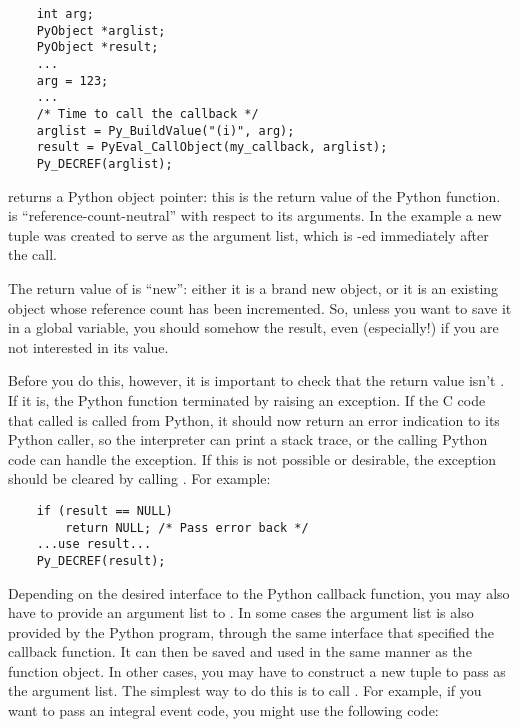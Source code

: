 \documentclass{manual}
\begin{document}
\begin{verbatim}
    int arg;
    PyObject *arglist;
    PyObject *result;
    ...
    arg = 123;
    ...
    /* Time to call the callback */
    arglist = Py_BuildValue("(i)", arg);
    result = PyEval_CallObject(my_callback, arglist);
    Py_DECREF(arglist);
\end{verbatim}

 returns a Python object pointer: this is
the return value of the Python function.   is
``reference-count-neutral'' with respect to its arguments.  In the
example a new tuple was created to serve as the argument list, which
is -ed immediately after the call.

The return value of  is ``new'': either it
is a brand new object, or it is an existing object whose reference
count has been incremented.  So, unless you want to save it in a
global variable, you should somehow  the result,
even (especially!) if you are not interested in its value.

Before you do this, however, it is important to check that the return
value isn't \NULL{}.  If it is, the Python function terminated by
raising an exception.  If the C code that called
 is called from Python, it should now
return an error indication to its Python caller, so the interpreter
can print a stack trace, or the calling Python code can handle the
exception.  If this is not possible or desirable, the exception should
be cleared by calling .  For example:

\begin{verbatim}
    if (result == NULL)
        return NULL; /* Pass error back */
    ...use result...
    Py_DECREF(result); 
\end{verbatim}

Depending on the desired interface to the Python callback function,
you may also have to provide an argument list to
.  In some cases the argument list is
also provided by the Python program, through the same interface that
specified the callback function.  It can then be saved and used in the
same manner as the function object.  In other cases, you may have to
construct a new tuple to pass as the argument list.  The simplest way
to do this is to call .  For example, if
you want to pass an integral event code, you might use the following
code:
\end{document}
